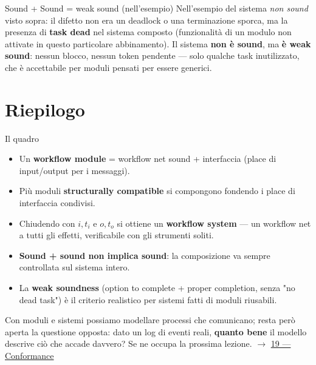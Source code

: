 \begin{boxtip}{Sound + Sound = weak sound (nell'esempio)}
Nell'esempio del sistema \emph{non sound} visto sopra: il difetto non era un deadlock o una terminazione sporca, ma la presenza di \textbf{task dead} nel sistema composto (funzionalità di un modulo non attivate in questo particolare abbinamento). Il sistema \textbf{non è sound}, ma \textbf{è weak sound}: nessun blocco, nessun token pendente — solo qualche task inutilizzato, che è accettabile per moduli pensati per essere generici.
\end{boxtip}

\section{\texorpdfstring{Riepilogo}{Riepilogo}}

\begin{boxabstract}{Il quadro}
\begin{itemize}
\item Un \textbf{workflow module} = workflow net sound + interfaccia (place di input/output per i messaggi).
\item Più moduli \textbf{structurally compatible} si compongono fondendo i place di interfaccia condivisi.
\item Chiudendo con $i,t_i$ e $o,t_o$ si ottiene un \textbf{workflow system} — un workflow net a tutti gli effetti, verificabile con gli strumenti soliti.
\item \textbf{Sound + sound non implica sound}: la composizione va sempre controllata sul sistema intero.
\item La \textbf{weak soundness} (option to complete + proper completion, senza "no dead task") è il criterio realistico per sistemi fatti di moduli riusabili.
\end{itemize}
\end{boxabstract}

Con moduli e sistemi possiamo modellare processi che comunicano; resta però aperta la questione opposta: dato un log di eventi reali, \textbf{quanto bene} il modello descrive ciò che accade davvero? Se ne occupa la prossima lezione. $\rightarrow$ \hyperref[ch:19]{19 — Conformance}